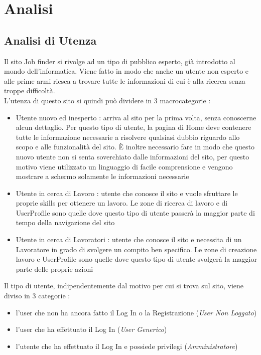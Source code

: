 \section{Analisi}
	
  \subsection{Analisi di Utenza}	
	  Il sito Job finder si rivolge ad un tipo di pubblico esperto, già introdotto al mondo dell’informatica. Viene fatto in modo che anche un utente non esperto e alle prime 
    armi riesca a trovare tutte le informazioni di cui è alla ricerca senza troppe difficoltà.\\	
    L’utenza di questo sito si quindi può dividere in 3 macrocategorie :
	  \begin{itemize}
      \item Utente nuovo ed inesperto : arriva al sito per la prima volta, senza conoscerne alcun dettaglio. Per questo tipo di utente, la pagina di Home deve contenere tutte 
      le informazione necessarie a risolvere qualsiasi dubbio riguardo allo scopo e alle funzionalità del sito. È inoltre necessario fare in modo che questo nuovo utente non si
      senta soverchiato dalle informazioni del sito, per questo motivo viene utilizzato un linguaggio di facile comprensione e vengono mostrare a schermo solamente le 
      informazioni necessarie
      \item Utente in cerca di Lavoro : utente che conosce il sito e vuole sfruttare le proprie skills per ottenere un lavoro. Le zone di ricerca di lavoro e di UserProfile 
      sono quelle dove questo tipo di utente passerà la maggior parte di tempo della navigazione del sito
      \item Utente in cerca di Lavoratori : utente che conosce il sito e necessita di un Lavoratore in grado di svolgere un compito ben specifico. Le zone di creazione lavoro 
      e UserProfile sono quelle dove questo tipo di utente svolgerà la maggior parte delle proprie azioni
    \end{itemize}
    Il tipo di utente, indipendentemente dal motivo per cui si trova sul sito, viene diviso in 3 categorie :
    \begin{itemize} 
      \item l’user che non ha ancora fatto il Log In o la Registrazione (\textit{User Non Loggato})
      \item l’user che ha effettuato il Log In (\textit{User Generico}) 
      \item l’utente che ha effettuato il Log In e possiede privilegi (\textit{Amministratore})
    \end{itemize}

